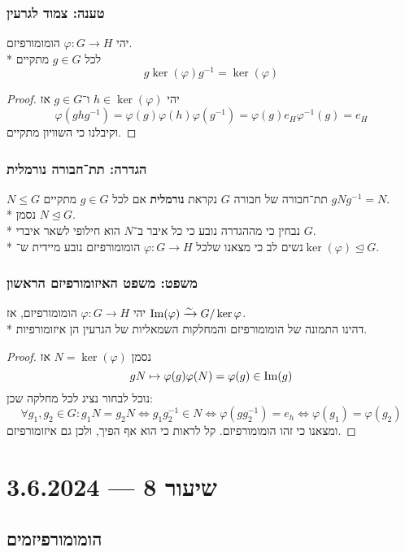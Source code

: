 \subsubsection{טענה: צמוד לגרעין}
יהי $\varphi : G \to H$ הומומורפיזם. \\*
לכל $g \in G$ מתקיים
\[
	g \ker(\varphi) g^{-1} = \ker(\varphi)
\]
\begin{proof}
	יהי $h \in \ker(\varphi)$ ו־$g \in G$ אז
	\[
		\varphi(g h g^{-1}) = \varphi(g) \varphi(h) \varphi(g^{-1}) = \varphi(g) e_H \varphi^{-1}(g) = e_H
	\]
	וקיבלנו כי השוויון מתקיים.
\end{proof}

\subsubsection{הגדרה: תת־חבורה נורמלית}
$N \le G$ תת־חבורה של חבורה $G$ נקראת \textbf{נורמלית} אם לכל $g \in G$ מתקיים $g N g^{-1} = N$. \\*
נסמן $N \trianglelefteq G$. \\*
נבחין כי מההגדרה נובע כי כל איבר ב־$N$ הוא חילופי לשאר איברי $G$. \\*
נשים לב כי מצאנו שלכל $\varphi : G \to H$ הומומורפיזם נובע מיידית ש־$\ker(\varphi) \trianglelefteq G$.

\subsubsection{משפט: משפט האיזומורפיזם הראשון}
יהי $\varphi : G \to H$ הומומורפיזם, אז $\operatorname{Im}(\varphi) \xrightarrow{\sim} G/\ker{\varphi}$. \\*
דהינו התמונה של הומומורפיזם והמחלקות השמאליות של הגרעין הן איזומורפיות.
\begin{proof}
	נסמן $N = \ker(\varphi)$ אז
	\[
		g N \mapsto \varphi(g) \varphi(N) = \varphi(g) \in \operatorname{Im}(g)
	\]
	נוכל לבחור נציג לכל מחלקה שכן:
	\[
		\forall g_1, g_2 \in G : g_1 N = g_2 N \iff g_1 g_2^{-1} \in N \iff \varphi(g g_2^{-1}) = e_h \iff \varphi(g_1) = \varphi(g_2)
	\]
	ומצאנו כי זהו הומומורפיזם. קל לראות כי הוא אף הפיך, ולכן גם איזומורפיזם.
\end{proof}

\section{שיעור 8 --- 3.6.2024}
\subsection{הומומורפיזמים}
